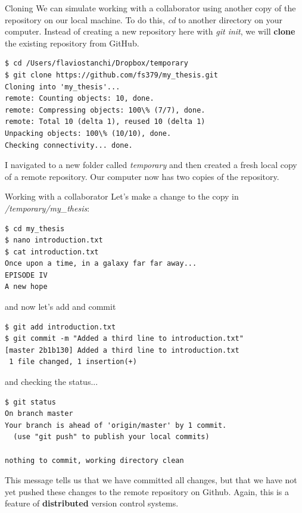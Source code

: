 \documentclass[10pt]{beamer}
\begin{document}
\begin{frame}[fragile]{Cloning}
We can simulate working with a collaborator using another copy of the repository on our local machine. To do this, \emph{cd} to another directory on your computer. Instead of creating a new repository here with \emph{git init}, we will \textbf{clone} the existing repository from GitHub.
\begin{lstlisting}
$ cd /Users/flaviostanchi/Dropbox/temporary
$ git clone https://github.com/fs379/my_thesis.git
Cloning into 'my_thesis'...
remote: Counting objects: 10, done.
remote: Compressing objects: 100\% (7/7), done.
remote: Total 10 (delta 1), reused 10 (delta 1)
Unpacking objects: 100\% (10/10), done.
Checking connectivity... done.
\end{lstlisting}
I navigated to a new folder called \emph{temporary} and then created a fresh local copy of a remote repository. Our computer now has two copies of the repository.

\end{frame}

\begin{frame}[fragile]{Working with a collaborator}
Let's make a change to the copy in \emph{/temporary/my\_thesis}:
\begin{lstlisting}
$ cd my_thesis
$ nano introduction.txt
$ cat introduction.txt
Once upon a time, in a galaxy far far away...
EPISODE IV
A new hope
\end{lstlisting}
and now let's add and commit
\begin{lstlisting}
$ git add introduction.txt
$ git commit -m "Added a third line to introduction.txt"
[master 2b1b130] Added a third line to introduction.txt
 1 file changed, 1 insertion(+)
\end{lstlisting}
and checking the status...
\begin{lstlisting}
$ git status
On branch master
Your branch is ahead of 'origin/master' by 1 commit.
  (use "git push" to publish your local commits)

nothing to commit, working directory clean
\end{lstlisting}
This message tells us that we have committed all changes, but that we have not yet pushed these changes to the remote repository on Github. Again, this is a feature of \textbf{distributed} version control systems.\\


\end{frame}
\end{document}
